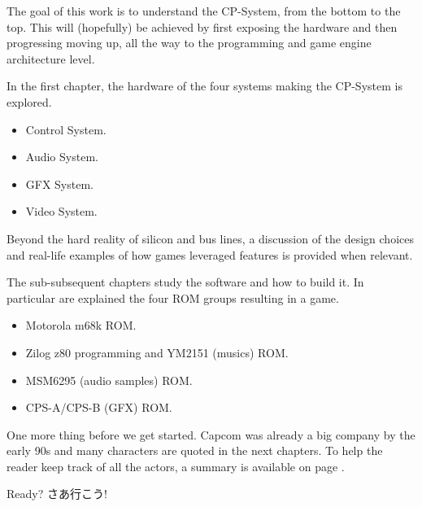 The goal of this work is to understand the CP-System, from the bottom to the top. This will (hopefully) be achieved by first exposing the hardware and then progressing moving up, all the way to the programming and game engine architecture level.

In the first chapter, the hardware of the four systems making the CP-System is explored.
\begin{itemize}[topsep=0pt]
\item Control System.
\item Audio System.
\item GFX System.
\item Video System.
\end{itemize}
 Beyond the hard reality of silicon and bus lines, a discussion of the design choices and real-life examples of how games leveraged features is provided when relevant.


The sub-subsequent chapters study the software and how to build it. In particular are explained the four ROM groups resulting in a game. 

\begin{itemize}[topsep=0pt]
\item Motorola m68k ROM.
\item Zilog z80 programming and YM2151 (musics) ROM.
\item MSM6295 (audio samples) ROM.
\item CPS-A/CPS-B (GFX) ROM.
\end{itemize}

One more thing before we get started. Capcom was already a big company by the early 90s and many characters are quoted in the next chapters. To help the reader keep track of all the actors, a summary is available on page \pageref{people}.

\begin{CJK}{UTF8}{min}
Ready? さあ行こう!
\end{CJK}



